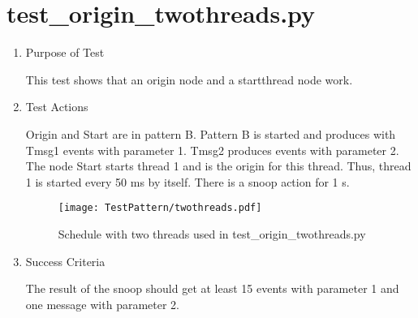 \documentclass[12pt,a4paper]{report}
\begin{document}
\section{test\_origin\_twothreads.py}
\begin{enumerate}
  \item Purpose of Test

  This test shows that an origin node and a startthread node work.
  \item Test Actions

  Origin and Start are in pattern B.
  Pattern B is started and produces with Tmsg1 events with parameter 1. Tmsg2 produces events with parameter 2.
  The node Start starts thread 1 and is the origin for this thread. Thus, thread 1 is started every 50 ms by itself.
  There is a snoop action for 1 s.
    \begin{figure}
        \centering
        \texttt{[image: TestPattern/twothreads.pdf]}
        \caption{Schedule with two threads used in test\_origin\_twothreads.py}
        \label{fig:schedule_twoThreads}
    \end{figure}
  \item Success Criteria

  The result of the snoop should get at least 15 events with parameter 1 and one message with parameter 2.
\end{enumerate}
\end{document}
